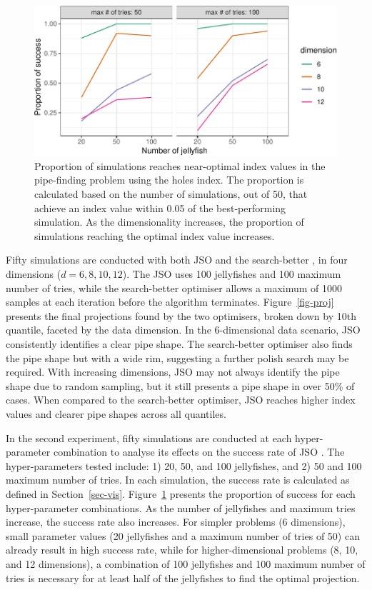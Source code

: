 \documentclass[
  number,
  preprint,
  3p]{elsarticle}
\begin{document}
\begin{figure}

{\centering \includegraphics{optim_files/figure-pdf/fig-proportion-1.pdf}

}

\caption{\label{fig-proportion}Proportion of simulations reaches
near-optimal index values in the pipe-finding problem using the holes
index. The proportion is calculated based on the number of simulations,
out of 50, that achieve an index value within 0.05 of the
best-performing simulation. As the dimensionality increases, the
proportion of simulations reaching the optimal index value increases.}

\end{figure}

Fifty simulations are conducted with both JSO and the search-better , in
four dimensions (\(d = 6, 8, 10, 12\)). The JSO uses 100 jellyfishes and
100 maximum number of tries, while the search-better optimiser allows a
maximum of 1000 samples at each iteration before the algorithm
terminates. Figure~\ref{fig-proj} presents the final projections found
by the two optimisers, broken down by 10th quantile, faceted by the data
dimension. In the 6-dimensional data scenario, JSO consistently
identifies a clear pipe shape. The search-better optimiser also finds
the pipe shape but with a wide rim, suggesting a further polish search
may be required. With increasing dimensions, JSO may not always identify
the pipe shape due to random sampling, but it still presents a pipe
shape in over 50\% of cases. When compared to the search-better
optimiser, JSO reaches higher index values and clearer pipe shapes
across all quantiles.

In the second experiment, fifty simulations are conducted at each
hyper-parameter combination to analyse its effects on the success rate
of JSO . The hyper-parameters tested include: 1) 20, 50, and 100
jellyfishes, and 2) 50 and 100 maximum number of tries. In each
simulation, the success rate is calculated as defined in
Section~\ref{sec-vis}. Figure~\ref{fig-proportion} presents the
proportion of success for each hyper-parameter combinations. As the
number of jellyfishes and maximum tries increase, the success rate also
increases. For simpler problems (6 dimensions), small parameter values
(20 jellyfishes and a maximum number of tries of 50) can already result
in high success rate, while for higher-dimensional problems (8, 10, and
12 dimensions), a combination of 100 jellyfishes and 100 maximum number
of tries is necessary for at least half of the jellyfishes to find the
optimal projection.
\end{document}
